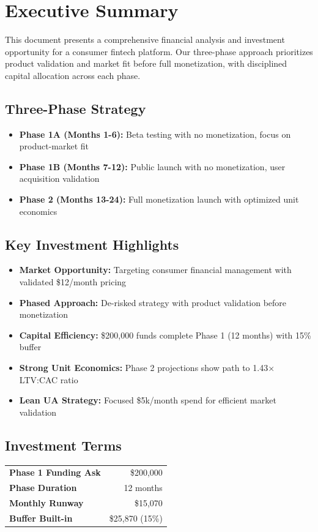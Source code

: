 \documentclass[11pt,letterpaper]{article}
\begin{document}
\tableofcontents
\newpage

\section{Executive Summary}

This document presents a comprehensive financial analysis and investment opportunity for a consumer fintech platform. Our three-phase approach prioritizes product validation and market fit before full monetization, with disciplined capital allocation across each phase.

\subsection{Three-Phase Strategy}

\begin{itemize}[leftmargin=*]
\item \textbf{Phase 1A (Months 1-6):} Beta testing with no monetization, focus on product-market fit
\item \textbf{Phase 1B (Months 7-12):} Public launch with no monetization, user acquisition validation
\item \textbf{Phase 2 (Months 13-24):} Full monetization launch with optimized unit economics
\end{itemize}

\subsection{Key Investment Highlights}

\begin{itemize}[leftmargin=*]
\item \textbf{Market Opportunity:} Targeting consumer financial management with validated \$12/month pricing
\item \textbf{Phased Approach:} De-risked strategy with product validation before monetization
\item \textbf{Capital Efficiency:} \$200,000 funds complete Phase 1 (12 months) with 15\% buffer
\item \textbf{Strong Unit Economics:} Phase 2 projections show path to 1.43× LTV:CAC ratio
\item \textbf{Lean UA Strategy:} Focused \$5k/month spend for efficient market validation
\end{itemize}

\subsection{Investment Terms}
\begin{center}
\begin{tabular}{|l|r|}
\hline
\textbf{Phase 1 Funding Ask} & \$200,000 \\
\textbf{Phase Duration} & 12 months \\
\textbf{Monthly Runway} & \$15,070 \\
\textbf{Buffer Built-in} & \$25,870 (15\%) \\
\hline
\end{tabular}
\end{center}
\end{document}

